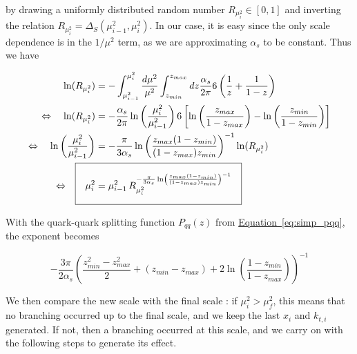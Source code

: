 \documentclass[a4paper,10pt]{report}
\newcommand{\eqlabel}{{Equation}}
\newcommand{\equref}[1]{\hyperref[#1]{\eqlabel~\ref*{#1}}}
\begin{document}
\begin{enumerate}
              by drawing a uniformly distributed random number $R_{\mu_i^2} \in [0,1]$ and inverting 
              the relation $R_{\mu_i^2} = \Delta_S(\mu_{i-1}^2, \mu_i^2)$. In our case, it is easy 
              since the only scale dependence is in the $1/\mu^2$ term, as we are approximating 
              $\alpha_s$ to be constant. Thus we have 

              \begin{align}
                \ln(R_{\mu_i^2}) &= -\int_{\mu_{i-1}^2}^{\mu_i^2}\frac{d\mu^2}{\mu^2}\int_{z_{min}}^{z_{max}}dz\frac{\alpha_s}{2\pi}
                6\left(\frac{1}{z} + \frac{1}{1-z}\right) \nonumber \\
                \Leftrightarrow \quad 
                \ln(R_{\mu_i^2}) &= -\frac{\alpha_s}{2\pi}\ln\left(\frac{\mu_i^2}{\mu_{i-1}^2}\right)
                6\left[\ln\left(\frac{z_{max}}{1-z_{max}}\right) - \ln\left(\frac{z_{min}}{1-z_{min}}\right)\right] \nonumber \\
                \Leftrightarrow \quad
                \ln\left(\frac{\mu_i^2}{\mu_{i-1}^2}\right) &= 
                -\frac{\pi}{3\alpha_s}\ln\left(\frac{z_{max}(1-z_{min})}{(1-z_{max})z_{min}}\right)^{-1}\ln(R_{\mu_i^2}) \nonumber \\
                \Leftrightarrow \quad
                \setlength\fboxsep{1em}
                \Aboxed{\mu_i^2 &= \mu_{i-1}^2\,R_{\mu_i^2}^{-\frac{\pi}{3\alpha_s}\ln\left(\frac{z_{max}(1-z_{min})}{(1-z_{max})z_{min}}\right)^{-1}}}
                \label{eq:simp_scalegen}
              \end{align}

              With the quark-quark splitting function $P_{qq}(z)$ from \equref{eq:simp_pqq}, the exponent becomes 

              \begin{equation}
              -\frac{3\pi}{2\alpha_s}\left(\frac{z_{min}^2-z_{max}^2}{2}+(z_{min}-z_{max})+2\ln\left(\frac{1-z_{min}}{1-z_{max}}\right)\right)^{-1}
              \end{equation}

              We then compare the new scale with the final scale : if $\mu_i^2 > \mu_f^2$, this 
              means that no branching occurred up to the final scale, and we keep the last 
              $x_i$ and $k_{t,i}$ generated. If not, then a branching occurred at this scale, 
              and we carry on with the following steps to generate its effect.\\


\end{enumerate}
\end{document}

